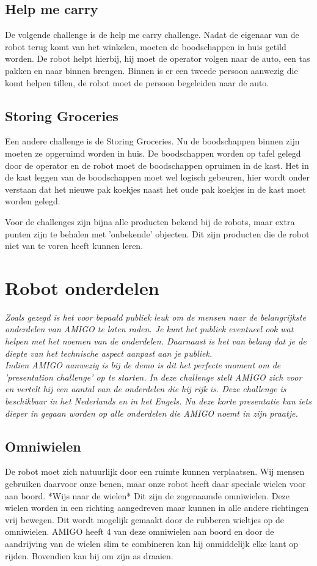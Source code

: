 \documentclass[a4paper,10pt]{article}
\numberwithin{equation}{section}
\numberwithin{figure}{section}
\numberwithin{table}{section}
\begin{document}
\subsection*{Help me carry}
De volgende challenge is de help me carry challenge. Nadat de eigenaar van de robot terug komt van het winkelen, moeten de boodschappen in huis getild worden. De robot helpt hierbij, hij moet de operator volgen naar de auto, een tas pakken en naar binnen brengen. Binnen is er een tweede persoon aanwezig die komt helpen tillen, de robot moet de persoon begeleiden naar de auto.

\subsection*{Storing Groceries}
Een andere challenge is de Storing Groceries. Nu de boodschappen binnen zijn moeten ze opgeruimd worden in huis. De boodschappen worden op tafel gelegd door de operator en de robot moet de boodschappen opruimen in de kast. Het in de kast leggen van de boodschappen moet wel logisch gebeuren, hier wordt onder verstaan dat het nieuwe pak koekjes naast het oude pak koekjes in de kast moet worden gelegd.\

Voor de challenges zijn bijna alle producten bekend bij de robots, maar extra punten zijn te behalen met 'onbekende' objecten. Dit zijn producten die de robot niet van te voren heeft kunnen leren.  

\section*{Robot onderdelen}
\textit{Zoals gezegd is het voor bepaald publiek leuk om de mensen naar de belangrijkste onderdelen van AMIGO te laten raden. Je kunt het publiek eventueel ook wat helpen met het noemen van de onderdelen. Daarnaast is het van belang dat je de diepte van het technische aspect aanpast aan je publiek.}\\

\textit{Indien AMIGO aanwezig is bij de demo is dit het perfecte moment om de 'presentation challenge' op te starten. In deze challenge stelt AMIGO zich voor en vertelt hij een aantal van de onderdelen die hij rijk is. Deze challenge is beschikbaar in het Nederlands en in het Engels. Na deze korte presentatie kan iets dieper in gegaan worden op alle onderdelen die AMIGO noemt in zijn praatje.}\\

\subsection*{Omniwielen}
De robot moet zich natuurlijk door een ruimte kunnen verplaatsen. Wij mensen gebruiken daarvoor onze benen, maar onze robot heeft daar speciale wielen voor aan boord. *Wijs naar de wielen* Dit zijn de zogenaamde omniwielen. Deze wielen worden in een richting aangedreven maar kunnen in alle andere richtingen vrij bewegen. Dit wordt mogelijk gemaakt door de rubberen wieltjes op de omniwielen. AMIGO heeft 4 van deze omniwielen aan boord en door de aandrijving van de wielen slim te combineren kan hij onmiddelijk elke kant op rijden. Bovendien kan hij om zijn as draaien. \\
\end{document}

